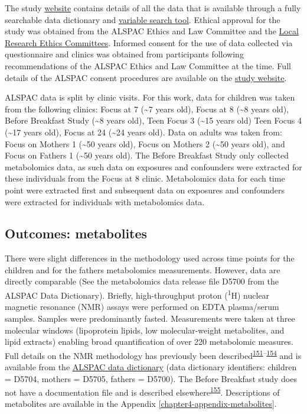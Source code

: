\documentclass[11pt,twoside]{bristolthesis}
\begin{document}
The study \href{http://www.bristol.ac.uk/alspac/}{website} contains details of all the data that is available through a fully searchable data dictionary and \href{http://www.bristol.ac.uk/alspac/researchers/our-data/}{variable search tool}. Ethical approval for the study was obtained from the ALSPAC Ethics and Law Committee and the \href{http://www.bristol.ac.uk/alspac/researchers/research-ethics/}{Local Research Ethics Committees}. Informed consent for the use of data collected via questionnaire and clinics was obtained from participants following recommendations of the ALSPAC Ethics and Law Committee at the time. Full details of the ALSPAC consent procedures are available on the \href{http://www.bristol.ac.uk/alspac/researchers/research-ethics/}{study website}.

ALSPAC data is split by clinic visits. For this work, data for children was taken from the following clinics: Focus at 7 (\textasciitilde{}7 years old), Focus at 8 (\textasciitilde{}8 years old), Before Breakfast Study (\textasciitilde{}8 years old), Teen Focus 3 (\textasciitilde{}15 years old) Teen Focus 4 (\textasciitilde{}17 years old), Focus at 24 (\textasciitilde{}24 years old). Data on adults was taken from: Focus on Mothers 1 (\textasciitilde{}50 years old), Focus on Mothers 2 (\textasciitilde{}50 years old), and Focus on Fathers 1 (\textasciitilde{}50 years old). The Before Breakfast Study only collected metabolomics data, as such data on exposures and confounders were extracted for these individuals from the Focus at 8 clinic. Metabolomics data for each time point were extracted first and subsequent data on exposures and confounders were extracted for individuals with metabolomics data.

\hypertarget{outcomes-metabolites}{%
\subsection{Outcomes: metabolites}\label{outcomes-metabolites}}

There were slight differences in the methodology used across time points for the children and for the fathers metabolomics measurements. However, data are directly comparable (See the metabolomics data release file D5700 from the ALSPAC Data Dictionary). Briefly, high-throughput proton (\textsuperscript{1}H) nuclear magnetic resonance (NMR) assays were performed on EDTA plasma/serum samples. Samples were predominantly fasted. Measurements were taken at three molecular windows (lipoprotein lipids, low molecular-weight metabolites, and lipid extracts) enabling broad quantification of over 220 metabolomic measures. Full details on the NMR methodology has previously been described\textsuperscript{\protect\hyperlink{ref-Soininen2009}{151}--\protect\hyperlink{ref-Soininen2015}{154}} and is available from the \href{http://www.bristol.ac.uk/alspac/researchers/access/}{ALSPAC data dictionary} (data dictionary identifiers: children = D5704, mothers = D5705, fathers = D5700). The Before Breakfast study does not have a documentation file and is described elsewhere\textsuperscript{\protect\hyperlink{ref-Ong2004}{155}}. Descriptions of metabolites are available in the Appendix \ref{chapter4-appendix-metabolites}.
\end{document}
